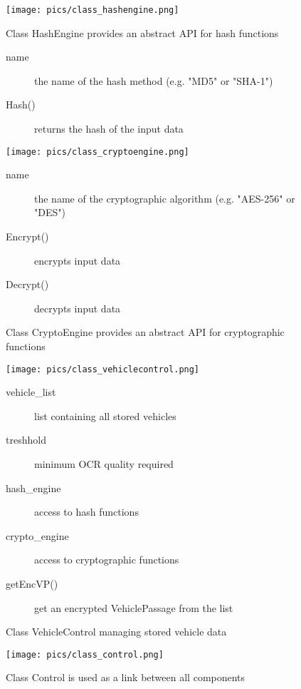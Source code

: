 \documentclass[oneside,bachelor,etd]{BYUPhys}
\begin{document}
\begin{figure}[p]
    \centerline{\texttt{[image: pics/class\_hashengine.png]}}
    \caption[Class HashEngine]{\label{fig:Class HashEngine}
	Class HashEngine provides an abstract API for hash functions}
	
	\begin{description}
	\item[name] the name of the hash method (e.g. "MD5" or "SHA-1")
	\item[Hash()] returns the hash of the input data
	\end{description}

    \centerline{\texttt{[image: pics/class\_cryptoengine.png]}}
    \caption[Class CryptoEngine]{\label{fig:Class CryptoEngine}
	Class CryptoEngine provides an abstract API for cryptographic functions}
	
	\begin{description}
	\item[name] the name of the cryptographic algorithm (e.g. "AES-256" or "DES")
	\item[Encrypt()] encrypts input data
	\item[Decrypt()] decrypts input data
	\end{description}
\end{figure}

\begin{figure}[p]
    \centerline{\texttt{[image: pics/class\_vehiclecontrol.png]}}
    \caption[Class VehicleControl]{\label{fig:Class VehicleControl}
	Class VehicleControl managing stored vehicle data}
	
	\begin{description}
	\item[vehicle\_list] list containing all stored vehicles
	\item[treshhold] minimum OCR quality required
	\item[hash\_engine] access to hash functions
	\item[crypto\_engine] access to cryptographic functions
	\item[getEncVP()] get an encrypted VehiclePassage from the list
	\end{description}
\end{figure}

\begin{figure}[p]
    \centerline{\texttt{[image: pics/class\_control.png]}}
    \caption[Class Control]{\label{fig:Class Control}
	Class Control is used as a link between all components}
\end{figure}
\end{document}
